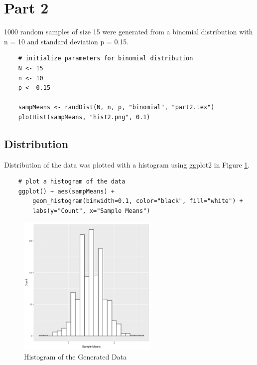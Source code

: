 \documentclass{article}
\begin{document}
    \clearpage

    \section{Part 2}
        1000 random samples of size 15 were generated from a binomial distribution with n = 10 and standard deviation p = 0.15.

\begin{lstlisting}
    # initialize parameters for binomial distribution
    N <- 15
    n <- 10
    p <- 0.15

    sampMeans <- randDist(N, n, p, "binomial", "part2.tex")
    plotHist(sampMeans, "hist2.png", 0.1)
\end{lstlisting}

        

        \subsection{Distribution}
            Distribution of the data was plotted with a histogram using ggplot2 in Figure \ref{fig:hist2}.
\begin{lstlisting}
    # plot a histogram of the data
    ggplot() + aes(sampMeans) + 
        geom_histogram(binwidth=0.1, color="black", fill="white") +
        labs(y="Count", x="Sample Means")
\end{lstlisting}

            \begin{figure}[h!]
                \begin{center}
                    \includegraphics[width=0.6\textwidth]{figures/hist2.png}
                    \caption{Histogram of the Generated Data} \label{fig:hist2}
                \end{center}
            \end{figure}
\end{document}
